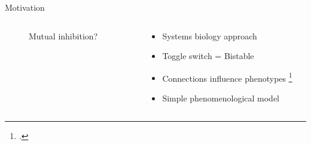 \documentclass[aspectratio=169,9pt]{beamer}
\begin{document}
    \begin{frame}{Motivation}
        \begin{columns}
            \begin{column}{0.33\textwidth}
                    \begin{figure}
                        \centering
                        \caption{Mutual inhibition?}
                    \end{figure}
                \end{column}
                \begin{column}{0.6\textwidth}
                    \begin{itemize}
                        \item Systems biology approach
                        \item Toggle switch = Bistable
                        \item Connections influence phenotypes \footcite{topo}
                        \item Simple phenomenological model
                    \end{itemize}
                \end{column}
            \end{columns}
    \end{frame}
\end{document}
